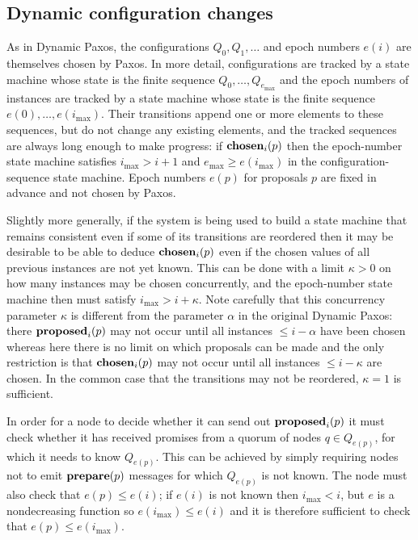 \documentclass[journal]{IEEEtran}
\begin{document}
\subsection{Dynamic configuration changes}

As in Dynamic Paxos, the configurations $Q_0, Q_1, \ldots$ and epoch numbers
$e(i)$ are themselves chosen by Paxos. In more detail, configurations are
tracked by a state machine whose state is the finite sequence $Q_0, \ldots,
Q_{e_\mathrm{max}}$ and the epoch numbers of instances are tracked by a state
machine whose state is the finite sequence $e(0), \ldots, e(i_\mathrm{max})$.
Their transitions append one or more elements to these sequences, but do not
change any existing elements, and the tracked sequences are always long enough
to make progress: if $\mathbf{chosen}_{i}(p)$ then the epoch-number state machine
satisfies $i_\mathrm{max} > i+1$ and $e_\mathrm{max} \ge e(i_\mathrm{max})$ in
the configuration-sequence state machine. Epoch numbers $e(p)$ for proposals
$p$ are fixed in advance and not chosen by Paxos.

Slightly more generally, if the system is being used to build a state machine
that remains consistent even if some of its transitions are reordered then it
may be desirable to be able to deduce $\mathbf{chosen}_{i}(p)$ even if the chosen values
of all previous instances are not yet known.  This can be done with a limit
$\kappa > 0$ on how many instances may be chosen concurrently, and the
epoch-number state machine then must satisfy $i_\mathrm{max} > i + \kappa$.
Note carefully that this concurrency parameter $\kappa$ is different from the
parameter $\alpha$ in the original Dynamic Paxos: there $\mathbf{proposed}_{i}(p)$ may not
occur until all instances $\le i - \alpha$ have been chosen whereas here there
is no limit on which proposals can be made and the only restriction is that
$\mathbf{chosen}_{i}(p)$ may not occur until all instances $\le i - \kappa$ are chosen.
In the common case that the transitions may not be reordered, $\kappa = 1$ is
sufficient.

In order for a node to decide whether it can send out $\mathbf{proposed}_{i}(p)$ it must
check whether it has received promises from a quorum of nodes $q \in Q_{e(p)}$,
for which it needs to know $Q_{e(p)}$. This can be achieved by simply requiring
nodes not to emit $\mathbf{prepare}(p)$ messages for which $Q_{e(p)}$ is not known. The
node must also check that $e(p) \le e(i)$; if $e(i)$ is not known then
$i_\mathrm{max} < i$, but $e$ is a nondecreasing function so $e(i_\mathrm{max})
\le e(i)$ and it is therefore sufficient to check that $e(p) \le
e(i_\mathrm{max})$.
\end{document}
